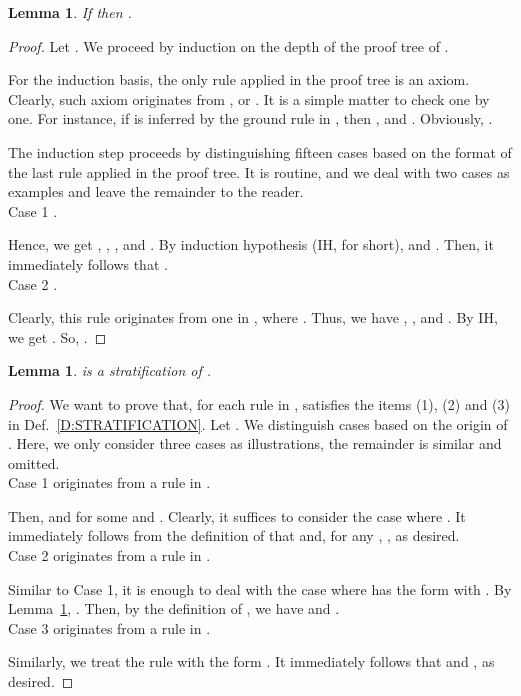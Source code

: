 \documentclass{elsarticle}
\theoremstyle{plain}
\newtheorem{lemma}[theorem]{Lemma}
\theoremstyle{definition}
\begin{document}
\begin{lemma}\label{L:POS}
    If  then .
\end{lemma}
\begin{proof}
Let .
 We proceed by induction on the depth of the proof tree of .

For the induction basis, the only rule applied in the proof tree is an axiom.
Clearly, such axiom originates from ,  or .
It is a simple matter to check one by one.
For instance, if  is inferred by the ground rule in , then ,  and . Obviously, .

The induction step proceeds by distinguishing fifteen cases based on the format of the last rule applied in the proof tree.
It is routine, and we deal with two cases as examples and leave the remainder to the reader.\\

\noindent Case 1 .

Hence, we get , , ,  and . By induction hypothesis (IH, for short),  and .
Then, it immediately follows that .\\

\noindent Case 2 .

Clearly, this rule originates from one in , where .
Thus, we have , ,  and .
By IH, we get .
So, .
\end{proof}

\begin{lemma}\label{L:Stratification}
     is a stratification of .
\end{lemma}
\begin{proof}


    We want to prove that, for each rule in ,  satisfies the items (1), (2) and (3) in Def.~\ref{D:STRATIFICATION}.
    Let .
    We distinguish cases based on the origin of . Here, we only consider three cases as illustrations, the remainder is similar and omitted.\\

\noindent Case 1  originates from a rule in .


    Then,  and  for some  and .
    Clearly, it suffices to consider the case where .
    It immediately follows from the definition of  that  and, for any , , as desired.\\

\noindent Case 2  originates from a rule in .

    Similar to Case 1, it is enough to deal with the case where  has the form  with .
By Lemma~\ref{L:POS}, .
    Then, by the definition of , we have 
    and .   \\

\noindent Case 3  originates from a rule in .

    Similarly, we treat the rule with the form .
It immediately follows that  and , as desired.
\end{proof}
\end{document}
